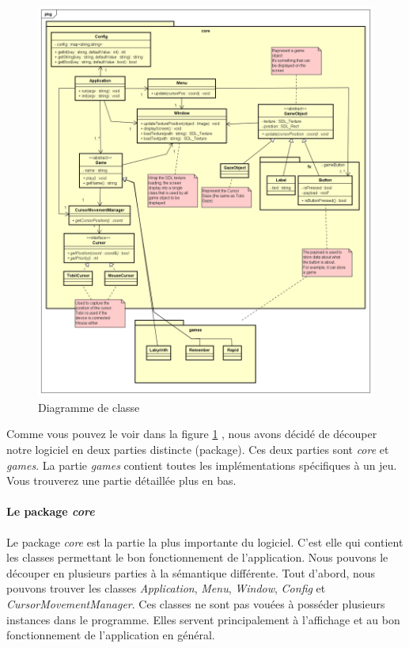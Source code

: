 \documentclass{polytech/polytech}
\begin{document}
\pagebreak
\begin{figure}
    \centering
    \includegraphics[width=15cm]{img/diagrammes/classDiag.png}
    \caption{Diagramme de classe}
    \label{fig:class_diag}
\end{figure}

Comme vous pouvez le voir dans la figure \ref{fig:class_diag} , nous avons décidé de découper notre logiciel en deux parties distincte (package). Ces deux parties sont \textit{core} et \textit{games}. La partie \textit{games} contient toutes les implémentations spécifiques à un jeu. Vous trouverez une partie détaillée plus en bas.

\paragraph{Le package \textit{core}}
Le package \textit{core} est la partie la plus importante du logiciel. C'est elle qui contient les classes permettant le bon fonctionnement de l'application. Nous pouvons le découper en plusieurs parties à la sémantique différente. 
Tout d'abord, nous pouvons trouver les classes \textit{Application}, \textit{Menu}, \textit{Window}, \textit{Config} et \textit{CursorMovementManager}. Ces classes ne sont pas vouées à posséder plusieurs instances dans le programme.  Elles servent principalement à l'affichage et au bon fonctionnement de l'application en général. 
\end{document}
